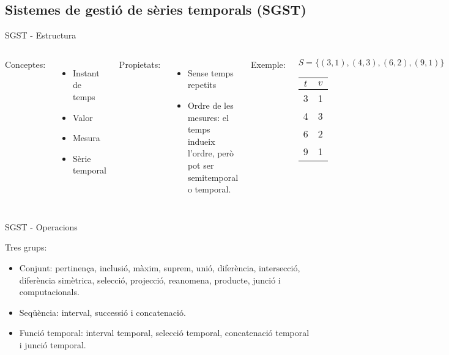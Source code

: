 \subsection[SGST]{Sistemes de gestió de sèries temporals (SGST)}




\begin{frame}{SGST - Estructura}
\begin{columns}

  \column{5cm}

  Conceptes:
  \begin{itemize}

  \item Instant de temps
  \item Valor
  \item Mesura
  \item Sèrie temporal

  \end{itemize}

  Propietats:
  \begin{itemize}

  \item Sense temps repetits
  \item Ordre de les mesures: el temps indueix l'ordre, però pot ser
    semitemporal o temporal.

  \end{itemize} 

  
  \column{5cm}
  Exemple:
  \begin{center}
    $S=\{(3,1), (4,3), (6,2), (9,1)\}$\\[1em]

    \begin{tabular}[h]{|c|c|}\hline
      $t$ & $v$ \\\hline
      3 & 1 \\
      4 & 3 \\
      6 & 2 \\
      9 & 1 \\\hline
    \end{tabular}

  \end{center}

\end{columns}
\end{frame}




\begin{frame}{SGST - Operacions}

  Tres grups:
  \begin{itemize}
    
  \item Conjunt: pertinença, inclusió, màxim, suprem, unió,
    diferència, intersecció, diferència simètrica, selecció,
    projecció, reanomena, producte, junció i computacionals.
  \item Seqüència: interval, successió i concatenació.
  \item Funció temporal: interval temporal, selecció temporal,
    concatenació temporal i junció temporal.

  \end{itemize}


\end{frame}


